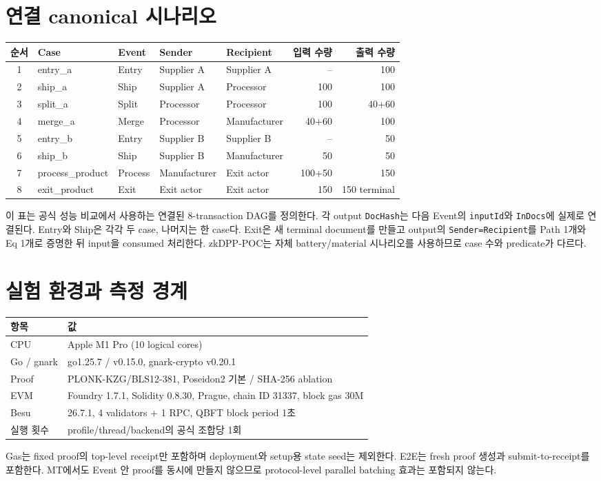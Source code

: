 \documentclass[10pt]{article}
\begin{document}
\section{연결 canonical 시나리오}
\begin{longtable}{cllllrr}
\toprule 순서 & Case & Event & Sender & Recipient & 입력 수량 & 출력 수량\\
\midrule\endhead
1 & entry\_a & Entry & Supplier A & Supplier A & -- & 100\\
2 & ship\_a & Ship & Supplier A & Processor & 100 & 100\\
3 & split\_a & Split & Processor & Processor & 100 & 40+60\\
4 & merge\_a & Merge & Processor & Manufacturer & 40+60 & 100\\
5 & entry\_b & Entry & Supplier B & Supplier B & -- & 50\\
6 & ship\_b & Ship & Supplier B & Manufacturer & 50 & 50\\
7 & process\_product & Process & Manufacturer & Exit actor & 100+50 & 150\\
8 & exit\_product & Exit & Exit actor & Exit actor & 150 & 150 terminal\\
\bottomrule
\end{longtable}
이 표는 공식 성능 비교에서 사용하는 연결된 8-transaction DAG를 정의한다. 각 output \texttt{DocHash}는 다음 Event의 \texttt{inputId}와 \texttt{InDocs}에 실제로 연결된다. Entry와 Ship은 각각 두 case, 나머지는 한 case다. Exit은 새 terminal document를 만들고 output의 \texttt{Sender=Recipient}를 Path 1개와 Eq 1개로 증명한 뒤 input을 consumed 처리한다. zkDPP-POC는 자체 battery/material 시나리오를 사용하므로 case 수와 predicate가 다르다.
\section{실험 환경과 측정 경계}
\begin{tabularx}{\textwidth}{lY}
\toprule 항목 & 값\\\midrule
CPU & Apple M1 Pro (10 logical cores)\\
Go / gnark & go1.25.7 / v0.15.0, gnark-crypto v0.20.1\\
Proof & PLONK-KZG/BLS12-381, Poseidon2 기본 / SHA-256 ablation\\
EVM & Foundry 1.7.1, Solidity 0.8.30, Prague, chain ID 31337, block gas 30M\\
Besu & 26.7.1, 4 validators + 1 RPC, QBFT block period 1초\\
실행 횟수 & profile/thread/backend의 공식 조합당 1회\\
\bottomrule
\end{tabularx}
Gas는 fixed proof의 top-level receipt만 포함하며 deployment와 setup용 state seed는 제외한다. E2E는 fresh proof 생성과 submit-to-receipt를 포함한다. MT에서도 Event 안 proof를 동시에 만들지 않으므로 protocol-level parallel batching 효과는 포함되지 않는다.
\end{document}
